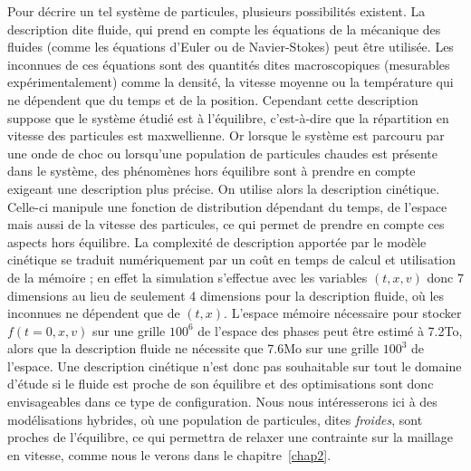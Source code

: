 Pour décrire un tel système de particules, plusieurs possibilités existent. La description dite fluide, qui prend en compte les équations de la mécanique des fluides (comme les équations d’Euler ou de Navier-Stokes) peut être utilisée. Les inconnues de ces équations sont des quantités dites macroscopiques (mesurables expérimentalement) comme la densité, la vitesse moyenne ou la température qui ne dépendent que du temps et de la position. Cependant cette description suppose que le système étudié est à l’équilibre, c’est-à-dire que la répartition en vitesse des particules est maxwellienne. Or lorsque le système est parcouru par une onde de choc ou lorsqu’une population de particules chaudes est présente dans le système, des phénomènes hors équilibre sont à prendre en compte exigeant une description plus précise. On utilise alors la description cinétique. Celle-ci manipule une fonction de distribution dépendant du temps, de l’espace mais aussi de la vitesse des particules, ce qui permet de prendre en compte ces aspects hors équilibre. La complexité de description apportée par le modèle cinétique se traduit numériquement par un coût en temps de calcul et utilisation de la mémoire ; en effet la simulation s’effectue avec les variables $(t,x,v)$ donc 7 dimensions au lieu de seulement 4 dimensions pour la description fluide, où les inconnues ne dépendent que de $(t,x)$. L’espace mémoire nécessaire pour stocker $f(t=0,x,v)$ sur une grille $100^6$ de l’espace des phases peut être estimé à 7.2To, alors que la description fluide ne nécessite que 7.6Mo sur une grille $100^3$ de l’espace. Une description cinétique n’est donc pas souhaitable sur tout le domaine d’étude si le fluide est proche de son équilibre et des optimisations sont donc envisageables dans ce type de configuration. Nous nous intéresserons ici à des modélisations hybrides, où une population de particules, dites \emph{froides}, sont proches de l'équilibre, ce qui permettra de relaxer une contrainte sur la maillage en vitesse, comme nous le verons dans le chapitre~\ref{chap2}.
